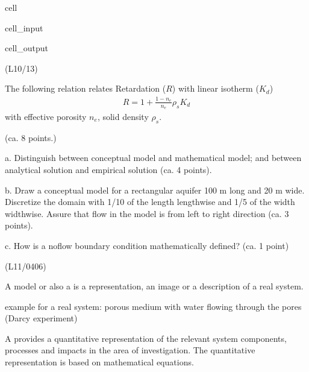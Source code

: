 \documentclass[letterpaper,10pt,english]{jupyterBook}
\begin{document}
\begin{sphinxuseclass}{cell}
\begin{sphinxVerbatimInput}
\begin{sphinxuseclass}{cell_input}
\end{sphinxuseclass}\end{sphinxVerbatimInput}
\begin{sphinxVerbatimOutput}

\begin{sphinxuseclass}{cell_output}
\noindent{}

\end{sphinxuseclass}\end{sphinxVerbatimOutput}

\end{sphinxuseclass}
\sphinxAtStartPar
{}
(L10/13)

\sphinxAtStartPar
The following relation relates Retardation (\(R\)) with linear isotherm (\(K_d\))
\begin{equation*}
\begin{split}
R = 1+ \frac{1-n_e}{n_e}\rho_s K_d
\end{split}
\end{equation*}
\sphinxAtStartPar
with effective porosity \(n_e\), solid density \(\rho_s\).

\sphinxAtStartPar
{} (ca. 8 points.)

\sphinxAtStartPar
a. Distinguish between conceptual model and mathematical model; and between analytical solution and empirical solution (ca. 4 points).

\sphinxAtStartPar
b. Draw a conceptual model for a rectangular aquifer 100 m long and 20 m wide. Discretize the domain with 1/10 of the length length\sphinxhyphen{}wise and 1/5 of the width width\sphinxhyphen{}wise. Assure that flow in the model is from left to right direction (ca. 3 points).

\sphinxAtStartPar
c. How is a no\sphinxhyphen{}flow boundary condition mathematically defined? (ca. 1 point)

\sphinxAtStartPar
{}
(L11/04\sphinxhyphen{}06)

\sphinxAtStartPar
A model or also a  is a representation, an image or a description of a real system.

\sphinxAtStartPar
example for a real system: porous medium with water flowing through the pores (Darcy experiment)

\sphinxAtStartPar
A  provides a quantitative representation of the relevant system components, processes and impacts in the area of investigation. The quantitative representation is based on mathematical equations.
\end{document}
